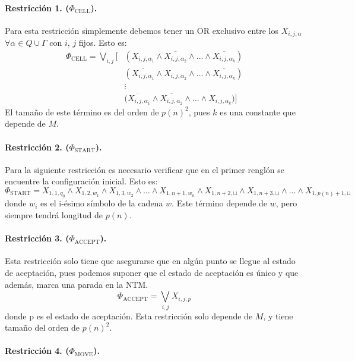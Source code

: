 \documentclass[a4paper]{article}
\begin{document}
\paragraph{Restricción 1. ($\Phi_{\text{CELL}}$).}

Para esta restricción simplemente debemos tener un OR exclusivo entre los $X_{i,j,\alpha}$ $\forall \alpha \in Q \cup \Gamma$ con $i$, $j$ fijos. Esto es:
\begin{align*}
  \Phi_{\text{CELL}} = \bigvee_{i,j} \Big[ &(X_{i,j,\alpha_1} \land \overline{X_{i,j,\alpha_2}} \land \dots \land \overline{X_{i,j,\alpha_k}}) \\
  &(\overline{X_{i,j,\alpha_1}} \land X_{i,j,\alpha_2} \land \dots \land \overline{X_{i,j,\alpha_k}})\\
  &\vdots\\
  &\overline{(X_{i,j,\alpha_1}} \land \overline{X_{i,j,\alpha_2}} \land \dots \land X_{i,j,\alpha_k}) \Big]
\end{align*}
El tamaño de este término es del orden de $p(n)^2$, pues $k$ es una constante que depende de $M$.

\paragraph{Restricción 2. ($\Phi_{\text{START}}$).}

Para la siguiente restricción es necesario verificar que en el primer renglón se encuentre la configuración inicial. Esto es:
$$\Phi_{\text{START}} = X_{1,1,q_0} \land X_{1,2,w_1} \land X_{1,3,w_2} \land \dots \land X_{1,n+1,w_n} \land X_{1,n+2,\sqcup} \land X_{1,n+3,\sqcup} \land \dots \land X_{1,p(n)+1,\sqcup}$$
donde $w_i$ es el i-ésimo símbolo de la cadena $w$. Este término depende de $w$, pero siempre tendrá longitud de $p(n)$.

\paragraph{Restricción 3. ($\Phi_{\text{ACCEPT}}$).}

Esta restricción solo tiene que asegurarse que en algún punto se llegue al estado de aceptación, pues podemos suponer que el estado de aceptación es único y que además, marca una parada en la NTM.
$$\Phi_{\text{ACCEPT}} = \bigvee_{i, j} X_{i,j,p}$$
donde p es el estado de aceptación. Esta restricción solo depende de $M$, y tiene tamaño del orden de $p(n)^2$.


\paragraph{Restricción 4. ($\Phi_{\text{MOVE}}$).}
\end{document}
